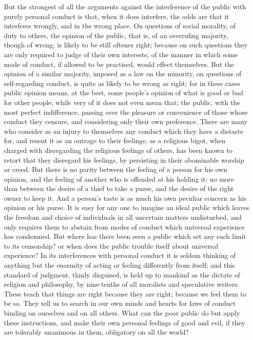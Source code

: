 \documentclass[11pt,openany]{book}
\begin{document}
But the strongest of all the arguments against the interference of the public with purely personal conduct is that, when it does interfere, the odds are that it interferes wrongly, and in the wrong place. On questions of social morality, of duty to others, the opinion of the public, that is, of an overruling majority, though of wrong, is likely to be still oftener right; because on such questions they are only required to judge of their own interests; of the manner in which some mode of conduct, if allowed to be practised, would effect themselves. But the opinion of a similar majority, imposed as a law on the minority, on questions of self-regarding conduct, is quite as likely to be wrong as right; for in these cases public opinion means, at the best, some people's opinion of what is good or bad for other people; while very of it does not even mean that; the public, with the most perfect indifference, passing over the pleasure or convenience of those whose conduct they censure, and considering only their own preference. There are many who consider as an injury to themselves any conduct which they have a distaste for, and resent it as an outrage to their feelings; as a religious bigot, when charged with disregarding the religious feelings of others, has been known to retort that they disregard his feelings, by persisting in their abominable worship or creed. But there is no parity between the feeling of a person for his own opinion, and the feeling of another who is offended at his holding it; no more than between the desire of a thief to take a purse, and the desire of the right owner to keep it. And a person's taste is as much his own peculiar concern as his opinion or his purse. It is easy for any one to imagine an ideal public which leaves the freedom and choice of individuals in all uncertain matters undisturbed, and only requires them to abstain from modes of conduct which universal experience has condemned. But where has there been seen a public which set any such limit to its censorship? or when does the public trouble itself about universal experience? In its interferences with personal conduct it is seldom thinking of anything but the enormity of acting or feeling differently from itself; and this standard of judgment, thinly disguised, is held up to mankind as the dictate of religion and philosophy, by nine-tenths of all moralists and speculative writers. These teach that things are right because they are right; because we feel them to be so. They tell us to search in our own minds and hearts for laws of conduct binding on ourselves and on all others. What can the poor public do but apply these instructions, and make their own personal feelings of good and evil, if they are tolerably unanimous in them, obligatory on all the world?
\end{document}
